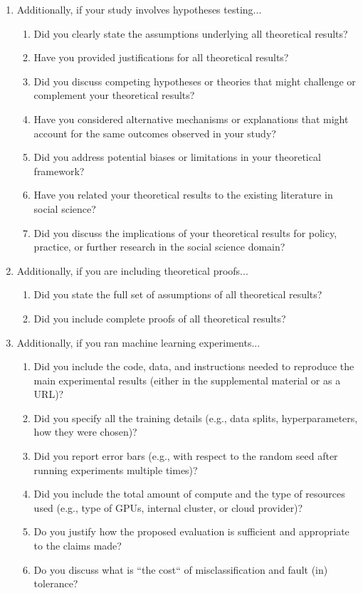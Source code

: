 \begin{enumerate}
\item Additionally, if your study involves hypotheses testing...
\begin{enumerate}
  \item Did you clearly state the assumptions underlying all theoretical results?
  \item Have you provided justifications for all theoretical results?
  \item Did you discuss competing hypotheses or theories that might challenge or complement your theoretical results?
  \item Have you considered alternative mechanisms or explanations that might account for the same outcomes observed in your study?
  \item Did you address potential biases or limitations in your theoretical framework?
  \item Have you related your theoretical results to the existing literature in social science?
  \item Did you discuss the implications of your theoretical results for policy, practice, or further research in the social science domain?
\end{enumerate}

\item Additionally, if you are including theoretical proofs...
\begin{enumerate}
  \item Did you state the full set of assumptions of all theoretical results?
  \item Did you include complete proofs of all theoretical results?
\end{enumerate}

\item Additionally, if you ran machine learning experiments...
\begin{enumerate}
  \item Did you include the code, data, and instructions needed to reproduce the main experimental results (either in the supplemental material or as a URL)?
  \item Did you specify all the training details (e.g., data splits, hyperparameters, how they were chosen)?
     \item Did you report error bars (e.g., with respect to the random seed after running experiments multiple times)?
	\item Did you include the total amount of compute and the type of resources used (e.g., type of GPUs, internal cluster, or cloud provider)?
     \item Do you justify how the proposed evaluation is sufficient and appropriate to the claims made? 
     \item Do you discuss what is ``the cost`` of misclassification and fault (in) tolerance?
  

\end{enumerate}
\end{enumerate}
